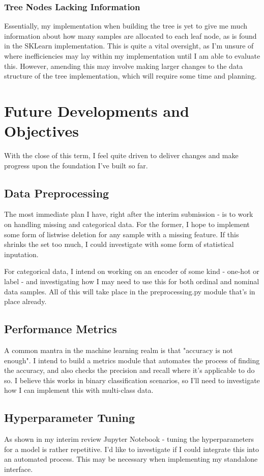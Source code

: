 \documentclass[letterpaper,10pt]{article}
\begin{document}
\subsubsection{Tree Nodes Lacking Information}
Essentially, my implementation when building the tree is yet to give me much information about how many samples are allocated to each leaf node, as is found in the SKLearn implementation. This is quite a vital oversight, as I'm unsure of where inefficiencies may lay within my implementation until I am able to evaluate this. However, amending this may involve making larger changes to the data structure of the tree implementation, which will require some time and planning. 
\section{Future Developments and Objectives} \label{futureplans}
With the close of this term, I feel quite driven to deliver changes and make progress upon the foundation I've built so far.

\subsection{Data Preprocessing}
The most immediate plan I have, right after the interim submission - is to work on handling missing and categorical data. For the former, I hope to implement some form of listwise deletion for any sample with a missing feature. If this shrinks the set too much, I could investigate with some form of statistical inputation.\par 
For categorical data, I intend on working on an encoder of some kind - one-hot or label - and investigating how I may need to use this for both ordinal and nominal data samples. All of this will take place in the preprocessing.py module that's in place already. \par
\subsection{Performance Metrics}
A common mantra in the machine learning realm is that "accuracy is not enough". I intend to build a metrics module that automates the process of finding the accuracy, and also checks the precision and recall where it's applicable to do so. I believe this works in binary classification scenarios, so I'll need to investigate how I can implement this with multi-class data. \par
\subsection{Hyperparameter Tuning}
As shown in my interim review Jupyter Notebook - tuning the hyperparameters for a model is rather repetitive. I'd like to investigate if I could integrate this into an automated process. This may be necessary when implementing my standalone interface. \par
\end{document}
